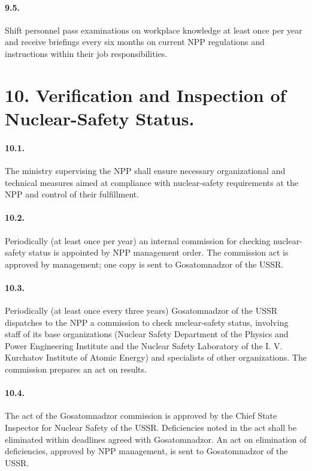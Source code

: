 \documentclass[openright]{bookest}
\begin{document}
\paragraph{9.5.} Shift personnel pass examinations on workplace knowledge at least once per year and receive briefings every six months on current NPP regulations and instructions within their job responsibilities.

\section*{10. Verification and Inspection of Nuclear-Safety Status.}

\paragraph{10.1.} The ministry supervising the NPP shall ensure necessary organizational and technical measures aimed at compliance with nuclear-safety requirements at the NPP and control of their fulfillment.

\paragraph{10.2.} Periodically (at least once per year) an internal commission for checking nuclear-safety status is appointed by NPP management order. The commission act is approved by management; one copy is sent to Gosatomnadzor of the USSR.

\paragraph{10.3.} Periodically (at least once every three years) Gosatomnadzor of the USSR dispatches to the NPP a commission to check nuclear-safety status, involving staff of its base organizations (Nuclear Safety Department of the Physics and Power Engineering Institute and the Nuclear Safety Laboratory of the I. V. Kurchatov Institute of Atomic Energy) and specialists of other organizations. The commission prepares an act on results.

\paragraph{10.4.} The act of the Gosatomnadzor commission is approved by the Chief State Inspector for Nuclear Safety of the USSR. Deficiencies noted in the act shall be eliminated within deadlines agreed with Gosatomnadzor. An act on elimination of deficiencies, approved by NPP management, is sent to Gosatomnadzor of the USSR.
\end{document}
